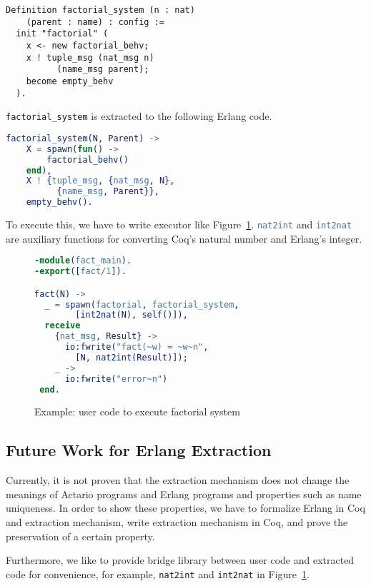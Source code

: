 \begin{lstlisting}
Definition factorial_system (n : nat)
    (parent : name) : config :=
  init "factorial" (
    x <- new factorial_behv;
    x ! tuple_msg (nat_msg n)
          (name_msg parent);
    become empty_behv
  ).
\end{lstlisting}

\lstinline|factorial_system| is extracted to the following Erlang code.

\begin{lstlisting}[language=erlang]
factorial_system(N, Parent) ->
    X = spawn(fun() ->
        factorial_behv()
    end),
    X ! {tuple_msg, {nat_msg, N},
          {name_msg, Parent}},
    empty_behv().
\end{lstlisting}

To execute this, we have to write executor like Figure~\ref{fig:erl:user}.
\lstinline[language=erlang]|nat2int| and \lstinline[language=erlang]|int2nat| are auxiliary functions for converting Coq's natural number and Erlang's integer.

\begin{figure}
\begin{lstlisting}[language=erlang]
-module(fact_main).
-export([fact/1]).

fact(N) ->
  _ = spawn(factorial, factorial_system,
        [int2nat(N), self()]),
  receive
    {nat_msg, Result} ->
      io:fwrite("fact(~w) = ~w~n",
        [N, nat2int(Result)]);
    _ ->
      io:fwrite("error~n")
 end.
\end{lstlisting}
\caption{Example: user code to execute factorial system}\label{fig:erl:user}
\end{figure}

\subsection{Future Work for Erlang Extraction}
Currently, it is not proven that the extraction mechanism does not change the meanings of Actario programs and Erlang programs and properties such as name uniqueness.
In order to show these properties, we have to formalize Erlang in Coq and extraction mechanism, write extraction mechanism in Coq, and prove the preservation of a certain property.

Furthermore, we like to provide bridge library between user code and extracted code for convenience, for example, \texttt{nat2int} and \texttt{int2nat} in Figure~\ref{fig:erl:user}.
